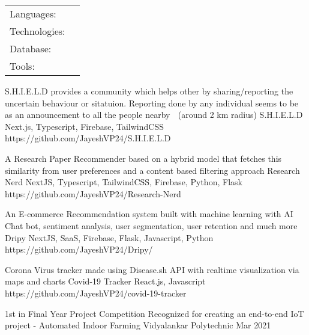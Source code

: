 \documentclass[]{awesome-cv}
\begin{document}
\begin{cventries}
	\cventry
	{}
	{\def\arraystretch{1.15}{\begin{tabular}{ l l }
		Languages:  & {\skill{ Javascript, Typescript, Python, Java, C++}} \\
		Technologies:  & {\skill{ React.js, Next.js, Node.js, Express, TailwindCSS, Sass, HTML, CSS, Redux, Firebase, x-state, UI/UX}} \\
		Database:  & {\skill{ MySQL, Firestore, MongoDB, PostgresSQL}} \\
		Tools:  & {\skill{ Figma, Postman, Git, VSCode, Notion, Github}} \\
		\end{tabular}}}
	{}
	{}
	{}
\end{cventries}

\vspace{-7mm}
\begin{cventries}
	\cventry
	{S.H.I.E.L.D provides a community which helps other by sharing/reporting the uncertain behaviour or sitatuion. Reporting done by any individual seems to be as an announcement to all the people nearby 📣 (around 2 km radius)}
	{S.H.I.E.L.D}
	{Next.js, Typescript, Firebase, TailwindCSS}
	{https://github.com/JayeshVP24/S.H.I.E.L.D}
	{}
	
	\vspace{-5mm}
	\cventry
	{A Research Paper Recommender based on a hybrid model that fetches this similarity from user preferences and a content based filtering approach}
	{Research Nerd}
	{NextJS, Typescript, TailwindCSS, Firebase, Python, Flask}
	{https://github.com/JayeshVP24/Research-Nerd}
	{}
	
	\vspace{-5mm}
	\cventry
	{An E-commerce Recommendation system built with machine learning with AI Chat bot, sentiment analysis, user segmentation, user retention and much more}
	{Dripy}
	{NextJS, SaaS, Firebase, Flask, Javascript, Python}
	{https://github.com/JayeshVP24/Dripy/}
	{}
	
	\vspace{-5mm}
	\cventry
	{Corona Virus tracker made using Disease.sh API with realtime visualization via maps and charts}
	{Covid-19 Tracker}
	{React.js, Javascript}
	{https://github.com/JayeshVP24/covid-19-tracker}
	{}
	
	\vspace{-5mm}
\end{cventries}
\begin{cvhonors}
	\cvhonor
	{1st in Final Year Project Competition}
	{Recognized for creating an end-to-end IoT project - Automated Indoor Farming}
	{Vidyalankar Polytechnic}
	{Mar 2021}
\end{cvhonors}
\ 
\end{document}
